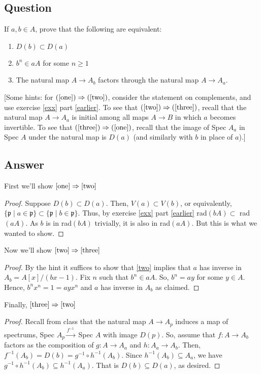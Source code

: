 \documentclass[11pt]{article}
\begin{document}
\subsection{Question}
If $a, b \in A$, prove that the following are equivalent:
\begin{enumerate}
\item \label{one} $D(b) \subset D(a)$
\item \label{two} $b^n \in aA$ for some $n \geq 1$
\item \label{three} The natural map $A \to A_b$ factors through the natural map $A \to A_a$.
\end{enumerate}
[Some hints: for $(\ref{one}) \Rightarrow (\ref{two})$, consider the statement on complements, and use exercise \ref{exx} part \ref{earlier}. To see that $(\ref{two}) \Rightarrow (\ref{three})$, recall that the natural map $A \to A_a$ is initial among all maps $A \to B$ in which $a$ becomes invertible. To see that $(\ref{three}) \Rightarrow (\ref{one})$, recall that the image of Spec $A_a$ in Spec $A$ under the natural map is $D(a)$ (and similarly with $b$ in place of $a$).]
\subsection{Answer}
First we'll show $\ref{one} \Rightarrow \ref{two}$
\begin{proof}
Suppose $D(b) \subset D(a)$. Then, $V(a) \subset V(b)$, or equivalently, $\{ \mathfrak{p} \mid a \in \mathfrak{p}\} \subset \{ \mathfrak{p} \mid b \in \mathfrak{p} \}$. Thus, by exercise \ref{exx} part \ref{earlier} rad$(bA) \subset$ rad$(aA)$. As $b$ is in rad$(bA)$ trivially, it is also in rad$(aA)$. But this is what we wanted to show.
\end{proof}

Now we'll show $\ref{two} \Rightarrow \ref{three}$
\begin{proof}
By the hint it suffices to show that \ref{two} implies that $a$ has inverse in  $A_b=A[x]/(bx-1)$. Fix $n$ such that $b^n \in aA$. So, $b^n = a y $ for some $y \in A$. Hence, $b^nx^n = 1 = a y x^n$ and $a$ has inverse in $A_b$ as claimed.
\end{proof}

Finally, $\ref{three} \Rightarrow \ref{two}$
\begin{proof}
Recall from class that the natural map $A \to A_p$ induces a map of spectrums, Spec $A_p \stackrel{f^{-1}}{\to} $ Spec $A$ with image $D(p)$. So, assume that $f: A \to A_b$ factors as the composition of $g:A \to A_a$ and $h: A_a \to A_b$. Then, $f^{-1} (A_b) = D(b) = g^{-1} \circ h^{-1} (A_b)$. Since $h^{-1}(A_b) \subseteq A_a$, we have $g^{-1} \circ h^{-1} (A_b) \subseteq h^{-1}(A_a)$. That is $D(b) \subseteq D(a)$, as desired.
\end{proof}
\end{document}
